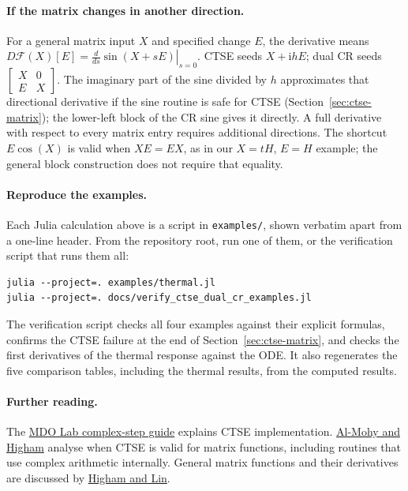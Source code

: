 \documentclass[11pt]{article}
\newcommand{\ii}{\mathrm i}
\begin{document}
\paragraph{If the matrix changes in another direction.}
For a general matrix input $X$ and specified change $E$, the derivative means
$D\mathcal F(X)[E]=\left.\frac{d}{ds}\sin(X+sE)\right|_{s=0}$.
CTSE seeds $X+\ii hE$; dual CR seeds
$\left[\begin{smallmatrix}X&0\\E&X\end{smallmatrix}\right]$.
The imaginary part of the sine divided by $h$ approximates that directional
derivative if the sine routine is safe for CTSE
(Section~\ref{sec:ctse-matrix}); the lower-left block of the CR sine gives it
directly. A full derivative with
respect to every matrix entry requires additional directions. The shortcut
$E\cos(X)$ is valid when $XE=EX$, as in our $X=tH$, $E=H$ example;
the general block construction does not require that equality.

\paragraph{Reproduce the examples.}
Each Julia calculation above is a script in \texttt{examples/}, shown verbatim
apart from a one-line header. From the repository root, run one of them, or the
verification script that runs them all:
\begin{lstlisting}
julia --project=. examples/thermal.jl
julia --project=. docs/verify_ctse_dual_cr_examples.jl
\end{lstlisting}
The verification script checks all four examples against their explicit
formulas, confirms the CTSE failure at the end of
Section~\ref{sec:ctse-matrix}, and checks the first derivatives of the thermal
response against the ODE. It also regenerates the five comparison tables,
including the thermal results, from the computed results.

\paragraph{Further reading.}
The \href{https://mdolab.engin.umich.edu/wiki/guide-complex-step-derivative-approximation}{MDO Lab complex-step guide}
explains CTSE implementation.
\href{https://doi.org/10.1007/s11075-009-9323-y}{Al-Mohy and Higham} analyse
when CTSE is valid for matrix functions, including routines that use complex
arithmetic internally. General matrix functions and their derivatives
are discussed by
\href{https://eprints.maths.manchester.ac.uk/2067/1/paper.pdf}{Higham and Lin}.
\end{document}
